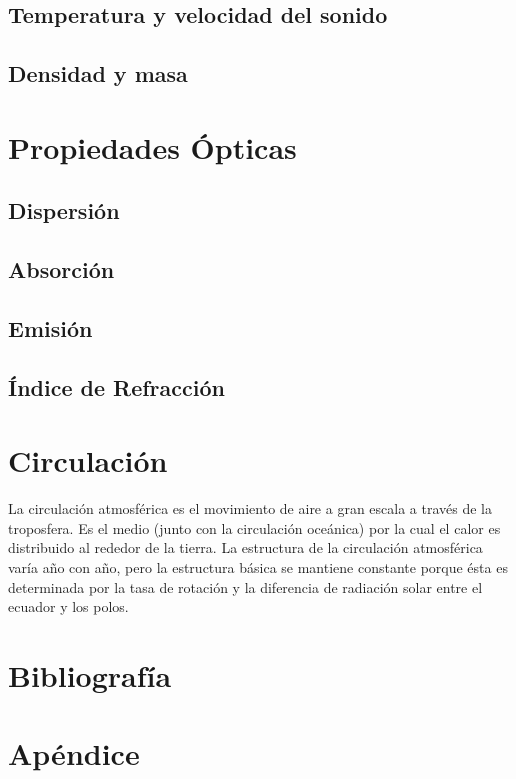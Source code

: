 \documentclass[12pt]{article}
\begin{document}
\subsection{Temperatura y velocidad del sonido}
\subsection{Densidad y masa}

\section{Propiedades Ópticas}
\subsection{Dispersión}
\subsection{Absorción}
\subsection{Emisión}
\subsection{Índice de Refracción}

\section{Circulación}

La circulación atmosférica es el movimiento de aire a gran escala a través de la troposfera. Es el medio (junto con la circulación oceánica) por la cual el calor es distribuido al rededor de la tierra. La estructura de la circulación atmosférica varía año con año, pero la estructura básica se mantiene constante porque ésta es determinada por la tasa de rotación y la diferencia de radiación solar entre el ecuador y los polos.


\section{Bibliografía}


\section{Apéndice}
\end{document}
